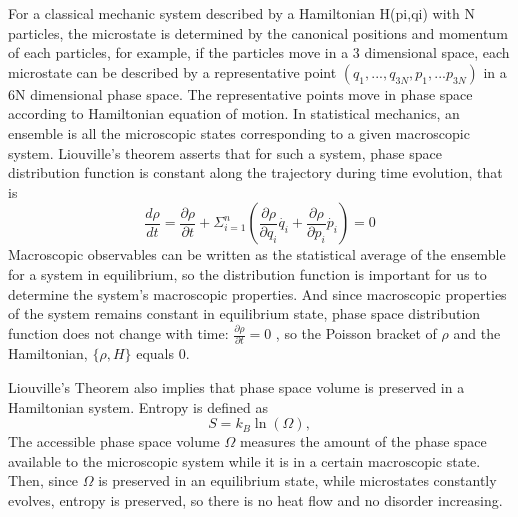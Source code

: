 For a classical mechanic system described by a Hamiltonian H(pi,qi) with N particles, the microstate is determined by the canonical positions and momentum of each particles, for example, if the particles move in a 3 dimensional space, each microstate can be described by a representative point $(q_{1},...,q_{3N},p_{1},...p_{3N})$ in a 6N dimensional phase space. The representative points move in phase space according to Hamiltonian equation of motion. In statistical mechanics, an ensemble is all the microscopic states corresponding to a given macroscopic system. Liouville’s theorem asserts that for such a system, phase space distribution function is constant along the trajectory during time evolution, that is
\begin{equation}
\frac{d\rho}{dt} = \frac{\partial\rho}{\partial t} + \Sigma_{i = 1}^{n}(\frac{\partial\rho}{\partial q_{i}}\dot{q_{i}}+\frac{\partial\rho}{\partial p_{i}}\dot{p_{i}}) = 0
\end{equation}
Macroscopic observables can be written as the statistical average of the ensemble for a system in equilibrium, so the distribution function is important for us to determine the system’s macroscopic properties. And since macroscopic properties of the system remains constant in equilibrium state, phase space distribution function does not change with time: $\frac{\partial\rho}{\partial t} = 0$
, so the Poisson bracket of $\rho$ and the Hamiltonian, $\{\rho, H\}$ equals 0.

Liouville’s Theorem also implies that phase space volume is preserved in a Hamiltonian system.
Entropy is defined as
\begin{equation}
	S = k_B\ln(\Omega),
	\label{eqS}
\end{equation}
The accessible phase space volume $\Omega$ measures the amount of the phase space available to the microscopic system while it is in a certain macroscopic state. Then, since $\Omega$ is preserved in an equilibrium state, while microstates constantly evolves, entropy is preserved, so there is no heat flow and no disorder increasing.
